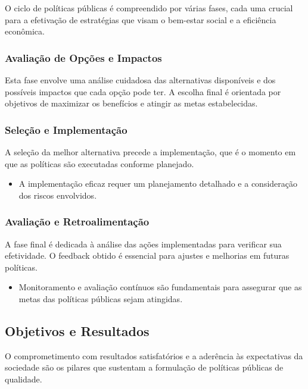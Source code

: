 \documentclass[
   article,       
   12pt,          
   oneside,       
   a4paper,       
   english,       
   brazil,        
   sumario=tradicional
   ]{abntex2}
\begin{document}
O ciclo de políticas públicas é compreendido por várias fases, cada uma crucial para a efetivação de estratégias que visam o bem-estar social e a eficiência econômica.

\subsubsection{Avaliação de Opções e Impactos}

Esta fase envolve uma análise cuidadosa das alternativas disponíveis e dos possíveis impactos que cada opção pode ter. A escolha final é orientada por objetivos de maximizar os benefícios e atingir as metas estabelecidas.

\subsubsection{Seleção e Implementação}

A seleção da melhor alternativa precede a implementação, que é o momento em que as políticas são executadas conforme planejado.

\begin{itemize}
    \item A implementação eficaz requer um planejamento detalhado e a consideração dos riscos envolvidos.
\end{itemize}

\subsubsection{Avaliação e Retroalimentação}

A fase final é dedicada à análise das ações implementadas para verificar sua efetividade. O feedback obtido é essencial para ajustes e melhorias em futuras políticas.

\begin{itemize}
    \item Monitoramento e avaliação contínuos são fundamentais para assegurar que as metas das políticas públicas sejam atingidas.
\end{itemize}

\subsection{Objetivos e Resultados}

O comprometimento com resultados satisfatórios e a aderência às expectativas da sociedade são os pilares que sustentam a formulação de políticas públicas de qualidade.
\end{document}
